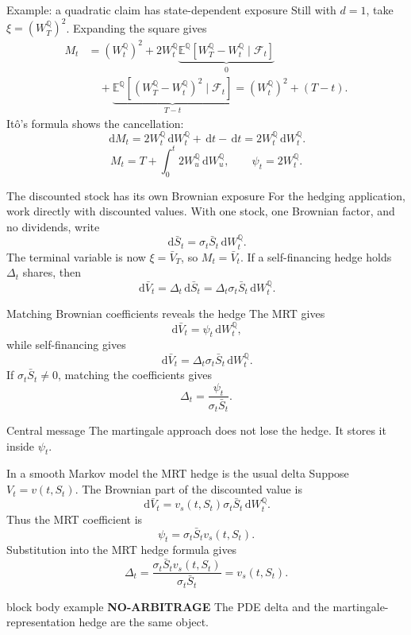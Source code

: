 \documentclass[handout,10pt,aspectratio=169]{beamer}
\newenvironment{marketbox}{\begin{beamercolorbox}[rounded=true,sep=0.7em,wd=\textwidth]{block body example}
  \textbf{\color{CourseGreen}NO-ARBITRAGE}\quad}{\end{beamercolorbox}}
\newcommand{\dd}{\,\mathrm d}
\newcommand{\E}{\mathbb E}
\newcommand{\Q}{\mathbb Q}
\newcommand{\cF}{\mathcal F}
\newcommand{\1}{\mathbf 1}
\begin{document}
\begin{frame}{Example: a quadratic claim has state-dependent exposure}
Still with \(d=1\), take \(\xi=(W_T^\Q)^2\). Expanding the square gives
\[
\begin{aligned}
M_t
&=(W_t^\Q)^2
 +2W_t^\Q\underbrace{\E^\Q[W_T^\Q-W_t^\Q\mid\cF_t]}_{0}\\
&\quad+\underbrace{\E^\Q[(W_T^\Q-W_t^\Q)^2\mid\cF_t]}_{T-t}
 =(W_t^\Q)^2+(T-t).
\end{aligned}
\]
It\^o's formula shows the cancellation:
\[
\dd M_t=2W_t^\Q\dd W_t^\Q+\dd t-\dd t
=2W_t^\Q\dd W_t^\Q.
\]
\[
\boxed{M_t=T+\int_0^t2W_u^\Q\dd W_u^\Q,}
\qquad \boxed{\psi_t=2W_t^\Q.}
\]
\end{frame}


\begin{frame}{The discounted stock has its own Brownian exposure}
For the hedging application, work directly with discounted values.
With one stock, one Brownian factor, and no dividends, write
\[
\boxed{\dd\bar S_t=\sigma_t\bar S_t\dd W_t^\Q.}
\]
The terminal variable is now \(\xi=\bar V_T\), so \(M_t=\bar V_t\).
If a self-financing hedge holds \(\Delta_t\) shares, then
\[
\dd\bar V_t=\Delta_t\dd\bar S_t
=\Delta_t\sigma_t\bar S_t\dd W_t^\Q.
\]
\end{frame}

\begin{frame}{Matching Brownian coefficients reveals the hedge}
The MRT gives
\[
\dd\bar V_t=\psi_t\dd W_t^\Q,
\]
while self-financing gives
\[
\dd\bar V_t=\Delta_t\sigma_t\bar S_t\dd W_t^\Q.
\]
If \(\sigma_t\bar S_t\neq0\), matching the coefficients gives
\[
\boxed{
\Delta_t=\frac{\psi_t}{\sigma_t\bar S_t}.}
\]
\begin{block}{Central message}
The martingale approach does not lose the hedge. It stores it inside
\(\psi_t\).
\end{block}
\end{frame}

\begin{frame}{In a smooth Markov model the MRT hedge is the usual delta}
Suppose \(V_t=v(t,S_t)\). The Brownian part of the discounted value is
\[
\dd\bar V_t=v_s(t,S_t)\sigma_t\bar S_t\dd W_t^\Q.
\]
Thus the MRT coefficient is
\[
\psi_t=\sigma_t\bar S_t v_s(t,S_t).
\]
Substitution into the MRT hedge formula gives
\[
\boxed{\Delta_t=\frac{\sigma_t\bar S_t v_s(t,S_t)}
{\sigma_t\bar S_t}=v_s(t,S_t).}
\]
\begin{marketbox}
The PDE delta and the martingale-representation hedge are the same object.
\end{marketbox}
\end{frame}
\end{document}
